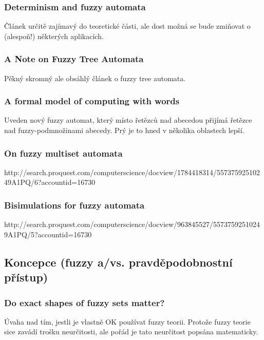 \documentclass[a4paper,10pt]{article}
\begin{document}
\subsubsection*{Determinism and fuzzy automata \cite{Bel-DetFuzzAut}}
Článek určitě zajímavý do teoretické části, ale dost možná se bude zmiňovat o (alespoň!) některých aplikacích.

\subsubsection*{A Note on Fuzzy Tree Automata \cite{ChaJos-NoteFuzzTreeAut}}
Pěkný skromný ale obsáhlý článek o fuzzy tree automata.

\subsubsection*{A formal model of computing with words \cite{Yin-FormModCompWords}}
Uveden nový fuzzy automat, který místo řetězců nad abecedou přijímá řetězce nad fuzzy-podmnožinami abecedy. Prý je to hned v několika oblastech lepší.

\subsubsection*{On fuzzy multiset automata}
http://search.proquest.com/computerscience/docview/1784418314/55737592510249A1PQ/6?accountid=16730

\subsubsection*{Bisimulations for fuzzy automata}
http://search.proquest.com/computerscience/docview/963845527/55737592510249A1PQ/5?accountid=16730


\subsection{Koncepce (fuzzy a/vs. pravděpodobnostní přístup)}

\subsubsection*{Do exact shapes of fuzzy sets matter? \cite{Bel-DoExaShaFuzzSetMatt}}
Úvaha nad tím, jestli je vlastně OK používat fuzzy teorii. Protože fuzzy teorie sice zavádí trošku neurčitosti, ale pořád je tato neurčitost popsána matematicky.
\end{document}
